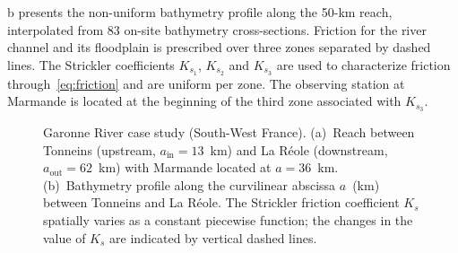 b presents the non-uniform bathymetry profile along the 50-km reach, interpolated from $83$ on-site bathymetry cross-sections. Friction for the river channel and its floodplain is prescribed over three zones separated by dashed lines. The Strickler coefficients $K_{s_1}$, $K_{s_2}$ and $K_{s_3}$ are used to characterize friction through~\cref{eq:friction} and are uniform per zone. The observing station at Marmande is located at the beginning of the third zone associated with $K_{s_3}$. 

\begin{figure}[!h]
\centering
{}
     
\caption{Garonne River case study (South-West France). (a)~Reach between Tonneins (upstream, $a_{\text{in}} = 13$~km) and La Réole (downstream, $a_{\text{out}} = 62$~km) with Marmande located at $a = 36$~km. (b)~Bathymetry profile along the curvilinear abscissa $a$~(km) between Tonneins and La Réole. The Strickler friction coefficient $K_s$ spatially varies as a constant piecewise function; the changes in the value of $K_s$ are indicated by vertical dashed lines.}
\label{fig:garonne}
\end{figure}

